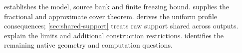 establishes the model, source bank and finite
freezing bound.  supplies the fractional and approximate
cover theorem.  derives the uniform profile consequences;
\cref{sec:shared-support} treats raw support shared across outputs.
 explain the limits and
additional construction restrictions.  identifies the
remaining native geometry and computation questions.
